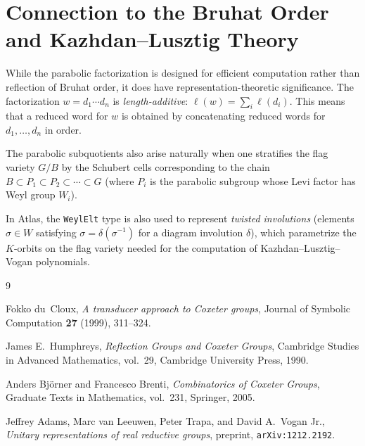 \documentclass[12pt]{amsart}
\begin{document}
\section{Connection to the Bruhat Order and Kazhdan--Lusztig Theory}

While the parabolic factorization is designed for efficient computation rather
than reflection of Bruhat order, it does have representation-theoretic
significance.  The factorization $w = d_1 \cdots d_n$ is \emph{length-additive}:
$\ell(w) = \sum_i \ell(d_i)$.  This means that a reduced word for $w$ is
obtained by concatenating reduced words for $d_1, \ldots, d_n$ in order.

The parabolic subquotients also arise naturally when one stratifies the flag
variety $G/B$ by the Schubert cells corresponding to the chain
$B \subset P_1 \subset P_2 \subset \cdots \subset G$ (where $P_i$ is the
parabolic subgroup whose Levi factor has Weyl group $W_i$).

In Atlas, the \texttt{WeylElt} type is also used to represent
\emph{twisted involutions} (elements $\sigma \in W$ satisfying $\sigma = \delta(\sigma^{-1})$ for a diagram involution $\delta$), which parametrize the $K$-orbits on the flag variety needed for the computation of Kazhdan--Lusztig--Vogan polynomials.


\begin{thebibliography}{9}

Fokko du~Cloux,
\textit{A transducer approach to Coxeter groups},
Journal of Symbolic Computation \textbf{27} (1999), 311--324.

James E.\ Humphreys,
\textit{Reflection Groups and Coxeter Groups},
Cambridge Studies in Advanced Mathematics, vol.\ 29,
Cambridge University Press, 1990.

Anders Bj\"orner and Francesco Brenti,
\textit{Combinatorics of Coxeter Groups},
Graduate Texts in Mathematics, vol.\ 231,
Springer, 2005.

Jeffrey Adams, Marc van Leeuwen, Peter Trapa, and David A.\ Vogan Jr.,
\textit{Unitary representations of real reductive groups},
preprint, \texttt{arXiv:1212.2192}.

\end{thebibliography}
\end{document}
